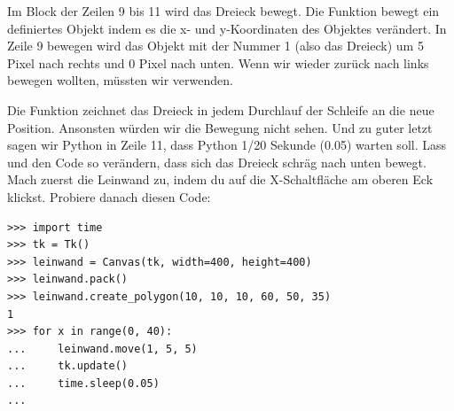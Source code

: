 Im Block der Zeilen 9 bis 11 wird das Dreieck bewegt. Die  Funktion bewegt ein definiertes Objekt indem es die x- und y-Koordinaten des Objektes verändert. In Zeile 9 bewegen wird das Objekt mit der Nummer 1 (also das Dreieck) um 5 Pixel nach rechts und 0 Pixel nach unten. Wenn wir wieder zurück nach links bewegen wollten, müssten wir  verwenden.

Die Funktion  zeichnet das Dreieck in jedem Durchlauf der Schleife an die neue Position. Ansonsten würden wir die Bewegung nicht sehen. Und zu guter letzt sagen wir Python in Zeile 11, dass Python 1/20 Sekunde (0.05) warten soll. Lass und den Code so verändern, dass sich das Dreieck schräg nach unten bewegt. Mach zuerst die Leinwand zu, indem du auf die X-Schaltfläche am oberen Eck klickst. Probiere danach diesen Code:

\begin{Verbatim}[frame=single]
>>> import time
>>> tk = Tk()
>>> leinwand = Canvas(tk, width=400, height=400)
>>> leinwand.pack()
>>> leinwand.create_polygon(10, 10, 10, 60, 50, 35)
1
>>> for x in range(0, 40):
...     leinwand.move(1, 5, 5)
...     tk.update()
...     time.sleep(0.05)
...
\end{Verbatim}

